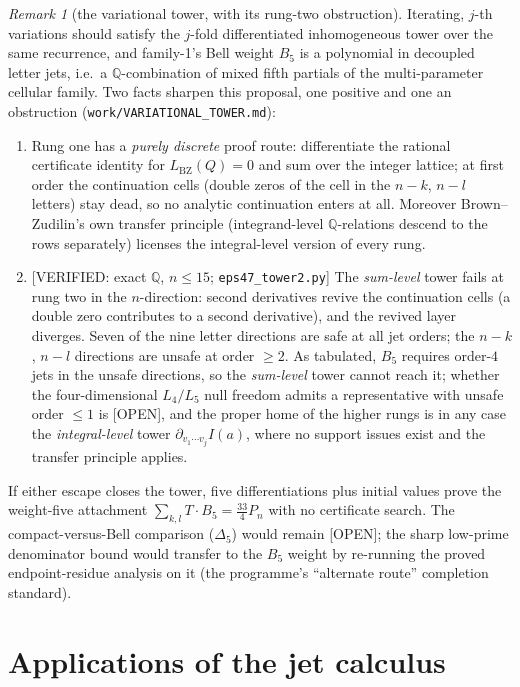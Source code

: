 \documentclass[11pt,reqno]{amsart}
\theoremstyle{plain}
\theoremstyle{definition}
\theoremstyle{remark}
\newtheorem{remark}[theorem]{Remark}
\newcommand{\Q}{\mathbb{Q}}
\newcommand{\Lbz}{L_{\mathrm{BZ}}}
\newcommand{\VerifiedR}[1]{\textup{\textsf{[VERIFIED: #1]}}}
\newcommand{\Open}{\textup{\textsf{[OPEN]}}}
\begin{document}
\begin{remark}[the variational tower, with its rung-two obstruction]
\label{rem:tower}
Iterating, $j$-th variations should satisfy the $j$-fold differentiated
inhomogeneous tower over the same recurrence, and family-1's Bell weight
$B_5$ is a polynomial in decoupled letter jets, i.e.\ a $\Q$-combination of
mixed fifth partials of the multi-parameter cellular family. Two facts
sharpen this proposal, one positive and one an obstruction
(\texttt{work/VARIATIONAL\_TOWER.md}):
\begin{enumerate}[leftmargin=2em]
\item Rung one has a \emph{purely discrete} proof route: differentiate the
rational certificate identity for $\Lbz(Q)=0$ and sum over the integer
lattice; at first order the continuation cells (double zeros of the cell in
the $n{-}k$, $n{-}l$ letters) stay dead, so no analytic continuation enters
at all. Moreover Brown--Zudilin's own transfer principle (integrand-level
$\Q$-relations descend to the rows separately) licenses the integral-level
version of every rung.
\item \VerifiedR{exact $\Q$, $n\le15$; \texttt{eps47\_tower2.py}} The
\emph{sum-level} tower fails at rung two in the $n$-direction: second
derivatives revive the continuation cells (a double zero contributes to a
second derivative), and the revived layer diverges. Seven of the nine
letter directions are safe at all jet orders; the $n{-}k$, $n{-}l$
directions are unsafe at order $\ge2$. As tabulated, $B_5$ requires
order-$4$ jets in the unsafe directions, so the \emph{sum-level} tower
cannot reach it; whether the four-dimensional $L_4/L_5$ null freedom
admits a representative with unsafe order $\le1$ is \Open, and the proper
home of the higher rungs is in any case the \emph{integral-level} tower
$\partial_{v_1\cdots v_j}I(a)$, where no support issues exist and the
transfer principle applies.
\end{enumerate}
If either escape closes the tower, five differentiations plus initial
values prove the weight-five attachment
$\sum_{k,l}T\cdot B_5=\tfrac{33}4P_n$ with no certificate search. The
compact-versus-Bell comparison ($\Delta_5$) would remain \Open; the sharp
low-prime denominator bound would transfer to the $B_5$ weight by
re-running the proved endpoint-residue analysis on it (the programme's
``alternate route'' completion standard).
\end{remark}

\section{Applications of the jet calculus}\label{sec:apps}
\end{document}
